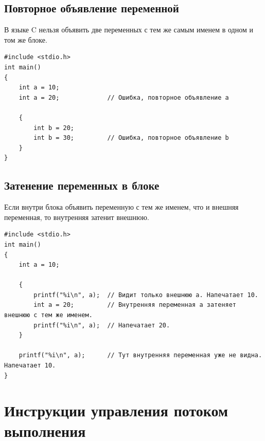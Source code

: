 \documentclass{article}
\begin{document}
\subsection*{Повторное объявление переменной}
В языке C нельзя объявить две переменных с тем же самым именем в одном и том же блоке. 
\begin{lstlisting}
#include <stdio.h>
int main() 
{
    int a = 10;
    int a = 20;				// Ошибка, повторное объявление a
    
    {
        int b = 20;			
        int b = 30;			// Ошибка, повторное объявление b
    }
}
\end{lstlisting}


\subsection*{Затенение переменных в блоке}
Если внутри блока объявить переменную с тем же именем, что и внешняя переменная, то внутренняя затенит внешнюю.
\begin{lstlisting}
#include <stdio.h>
int main() 
{
    int a = 10;
    
    {
        printf("%i\n", a);  // Видит только внешнюю a. Напечатает 10.
        int a = 20;			// Внутренняя переменная a затеняет внешнюю с тем же именем.
        printf("%i\n", a);  // Напечатает 20.
    }
    
    printf("%i\n", a);  	// Тут внутренняя переменная уже не видна. Напечатает 10.
}
\end{lstlisting}



\newpage
\section*{Инструкции управления потоком выполнения}
\end{document}
